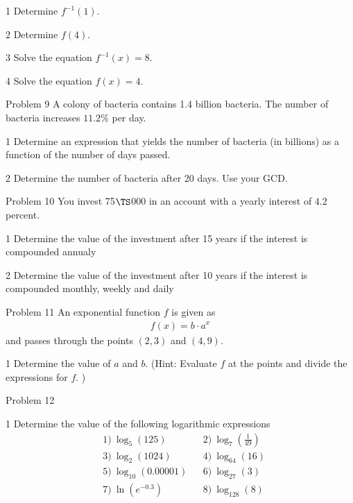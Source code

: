 \begin{delopgave}{1}
	Determine $f^{-1}(1)$.
\end{delopgave}
\begin{delopgave}{2}
	Determine $f(4)$.
\end{delopgave}
\begin{delopgave}{3}
	Solve the equation $f^{-1}(x) = 8$.
\end{delopgave}
\begin{delopgave}{4}
	Solve the equation $f(x) = 4$.
\end{delopgave}
%
%
%
%
\begin{opgavetekst}{Problem 9}
	A colony of bacteria contains 1.4 billion bacteria. The number of bacteria increases $11.2\%$ per day.
\end{opgavetekst}
\begin{delopgave}{1}
	Determine an expression that yields the number of bacteria (in billions) as a function of the number of 
	days passed. 
\end{delopgave}
\begin{delopgave}{2}
	Determine the number of bacteria after 20 days. Use your GCD. 
\end{delopgave}
%
%
%
%
\newpage
\begin{opgavetekst}{Problem 10}
	You invest 75$\TS$000 in an account with a yearly interest of $4.2$ percent.  
\end{opgavetekst}
\begin{delopgave}{1}
	Determine the value of the investment after 15 years if the interest is compounded annualy
\end{delopgave}
\begin{delopgave}{2}
	Determine the value of the investment after 10 years if the interest is compounded monthly, weekly
	and daily	
\end{delopgave}
%
%
%
%
\begin{opgavetekst}{Problem 11}
	An exponential function $f$ is given as
	\begin{align*}
		f(x) = b\cdot a^x
	\end{align*}
	and passes through the points $(2,3)$ and $(4,9)$. 
\end{opgavetekst}
\begin{delopgave}{1}
	Determine the value of $a$ and $b$. (Hint: Evaluate $f$ at the points and divide the expressions for $f$. )
\end{delopgave}
%
%
%
%
\begin{opgavetekst}{Problem 12}
\end{opgavetekst}
\begin{delopgave}{1}
	Determine the value of the following logarithmic expressions
	\begin{align*}
		&1) \ \log_{5}(125)& &2) \ \log_{7}\left(\frac{1}{49}\right)\\
		&3) \ \log_{2}(1024)& &4) \ \log_{64}(16)\\
		&5) \ \log_{10}(0.00001)& &6) \ \log_{27}(3)\\
		&7) \ \ln(e^{-0.3})& &8) \ \log_{128}(8)\\
	\end{align*}
\end{delopgave}
